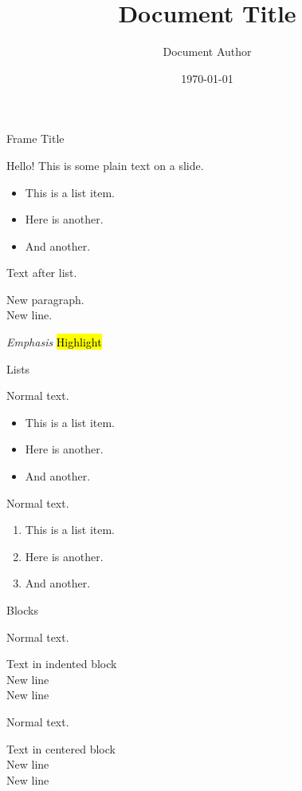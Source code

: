 \documentclass[11pt]{khslides}
\title{Document Title}
\author{Document Author}
\date{\today}
\begin{document}
\begin{titleslide}
\maketitle
\end{titleslide}


\begin{slide}{Frame Title}

Hello! This is some plain text on a slide.

\begin{itemize}
\item This is a list item.
\item Here is another.
\item And another.
\end{itemize}

Text after list.

New paragraph.
\\ New line.

\emph{Emphasis} \quad {} \quad \hl{Highlight} \quad {}

 \quad {} \quad {} \quad {} \quad {}

\end{slide}


\begin{slide}{Lists}

Normal text.
\begin{itemize}
\item This is a list item.
\item Here is another.
\item And another.
\end{itemize}

Normal text.
\begin{enumerate}
\item This is a list item.
\item Here is another.
\item And another.
\end{enumerate}

\end{slide}


\begin{slide}{Blocks}

Normal text.
\begin{indentblock}
Text in indented block \\
New line \\
New line
\end{indentblock}

Normal text.
\begin{centerblock}
Text in centered block \\
New line \\
New line
\end{centerblock}


\end{slide}
\end{document}
